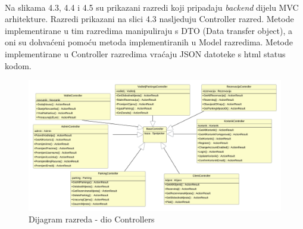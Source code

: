 \paragraph{}
{Na slikama 4.3, 4.4 i 4.5 su prikazani razredi koji pripadaju \emph{backend} dijelu MVC
arhitekture. Razredi prikazani na slici 4.3 nasljeduju Controller razred. Metode implementirane u tim razredima manipuliraju s DTO (Data transfer object), a oni su dohvaćeni pomoću metoda implementiranih u Model razredima. Metode implementirane u Controller razredima vraćaju JSON datoteke s html status kodom.
}
\vfill
\begin{figure}[!htb]
	\centering
	\includegraphics[width=1\linewidth]{dijagrami/ControllersDiagram.png}
	\caption{Dijagram razreda - dio Controllers}
	\label{fig:controllersdiagram}
	\vfill
\end{figure}



